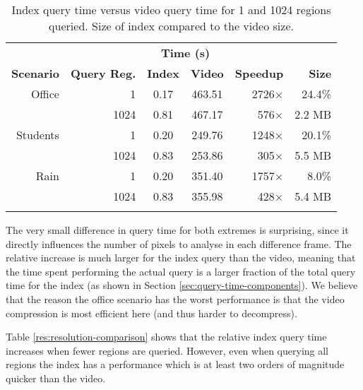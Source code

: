 \begin{table}[t]
    \caption{Index query time versus video query time for 1 and 1024 regions queried. Size of index compared to the video size.}\label{res:scenario-comparison}
	\centering
    \begin{tabular}{r r c c r r}
		~ & ~ & \multicolumn{2}{c}{\textbf{Time (s)}} & ~ & \\
		\cline{3-4}
	    \textbf{Scenario} & \textbf{Query Reg.} & \textbf{Index} & \textbf{Video} & \textbf{Speedup} & \textbf{Size}  \\ \hline\noalign{\smallskip}
	    Office   & 1               & 0.17       & 463.51     & 2726$\times$  & 24.4\% \\
	    ~        & 1024            & 0.81       & 467.17     & 576$\times$   & 2.2 MB     \\\noalign{\smallskip} \hline\noalign{\smallskip}
	    Students & 1               & 0.20       & 249.76     & 1248$\times$  & 20.1\% \\
	    ~        & 1024            & 0.83       & 253.86     & 305$\times$   & 5.5 MB     \\\noalign{\smallskip} \hline\noalign{\smallskip}
	    Rain     & 1               & 0.20       & 351.40     & 1757$\times$  & 8.0\% \\
	    ~        & 1024            & 0.83       & 355.98     & 428$\times$   & 5.4 MB     \\\noalign{\smallskip} \hline
	    \end{tabular}
\end{table}

The very small difference in query time for both extremes is surprising, since it directly influences the number of pixels to analyse in each difference frame. The relative increase is much larger for the index query than the video, meaning that the time spent performing the actual query is a larger fraction of the total query time for the index (as shown in Section \ref{sec:query-time-components}). We believe that the reason the office scenario has the worst performance is that the video compression is most efficient here (and thus harder to decompress).

Table \ref{res:resolution-comparison} shows that the relative index query time increases when fewer regions are queried. However, even when querying all regions the index has a performance which is at least two orders of magnitude quicker than the video.


